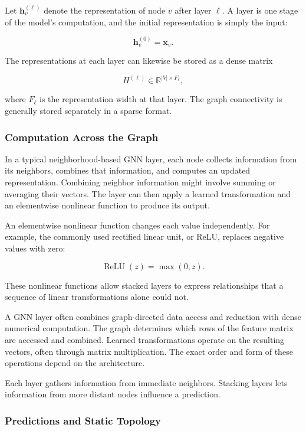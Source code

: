 Let $\mathbf{h}_v^{(\ell)}$ denote the representation of node $v$ after layer $\ell$. A layer is one stage of the model's computation, and the initial representation is simply the input:

\[
  \mathbf{h}_v^{(0)}=\mathbf{x}_v.
\]

The representations at each layer can likewise be stored as a dense matrix

\[
  H^{(\ell)}\in\mathbb{R}^{|V|\times F_\ell},
\]

where $F_\ell$ is the representation width at that layer. The graph connectivity is generally stored separately in a sparse format.

\subsubsection{Computation Across the Graph}

In a typical neighborhood-based GNN layer, each node collects information from its neighbors, combines that information, and computes an updated representation. Combining neighbor information might involve summing or averaging their vectors. The layer can then apply a learned transformation and an elementwise nonlinear function to produce its output.

An elementwise nonlinear function changes each value independently. For example, the commonly used rectified linear unit, or ReLU, replaces negative values with zero:

\[
  \operatorname{ReLU}(z)=\max(0,z).
\]

These nonlinear functions allow stacked layers to express relationships that a sequence of linear transformations alone could not.

A GNN layer often combines graph-directed data access and reduction with dense numerical computation. The graph determines which rows of the feature matrix are accessed and combined. Learned transformations operate on the resulting vectors, often through matrix multiplication. The exact order and form of these operations depend on the architecture.

Each layer gathers information from immediate neighbors. Stacking layers lets information from more distant nodes influence a prediction.

\subsubsection{Predictions and Static Topology}

